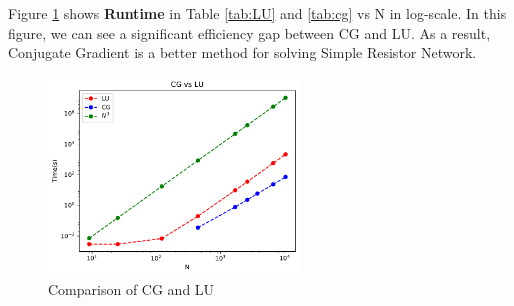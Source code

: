 \documentclass{article}
\begin{document}
Figure \ref{fig:cg vs lu} shows \textbf{Runtime} in Table \ref{tab:LU} and \ref{tab:cg} vs N in log-scale. In this figure, we can see a significant 
efficiency gap between CG and LU. As a result, Conjugate Gradient is a better method for solving Simple Resistor Network.
\begin{figure}[H]
	\centering
	\includegraphics[width=0.6\textwidth]{src/cg_vs_lu.pdf}
	\caption{Comparison of CG and LU}
	\label{fig:cg vs lu}
\end{figure}
\end{document}
